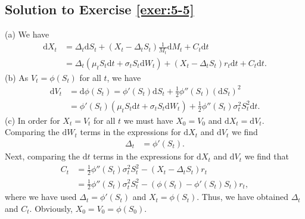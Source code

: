 \documentclass[12pt]{book}
\numberwithin{equation}{chapter}
\theoremstyle{plain}
\numberwithin{theorem}{section}
\theoremstyle{definition}
\numberwithin{exercise}{chapter}
\newcommand{\<}{\langle}
\renewcommand{\>}{\rangle}
\renewcommand{\(}{\left(}
\renewcommand{\)}{\right)}
\renewcommand{\[}{\left[}
\renewcommand{\]}{\right]}
\newcommand\sig{\sigma}
\newcommand\Del{\Delta}
\newcommand\dd{\mathrm{d}}
\theoremstyle{definition}
\numberwithin{question}{section}
\begin{document}
\subsection*{Solution to Exercise \ref{exer:5-5}}
(a) We have
\begin{align}
\dd X_t
	&=	\Del_t \dd S_t + (X_t - \Del_t S_t) \frac{1}{M_t} \dd M_t + C_t \dd t \\
	&=	\Del_t ( \mu_t S_t \dd t + \sig_t S_t \dd W_t ) + (X_t - \Del_t S_t) r_t \dd t + C_t \dd t . 
\end{align}
(b) As $V_t = \phi(S_t)$ for all $t$, we have
\begin{align}
\dd V_t
	&=	\dd \phi(S_t)
	=		\phi'(S_t) \dd S_t + \tfrac{1}{2} \phi''(S_t) (\dd S_t)^2 \\
	&=	\phi'(S_t) ( \mu_t S_t \dd t + \sig_t S_t \dd W_t ) + \tfrac{1}{2} \phi''(S_t) \sig_t^2 S_t^2 \dd t .
\end{align}
(c) In order for $X_t = V_t$ for all $t$ we must have $X_0 = V_0$ and $\dd X_t = \dd V_t$.  Comparing the $\dd W_t$ terms in the expressions for $\dd X_t$ and $\dd V_t$ we find
\begin{align}
\Del_t
	&=	\phi'(S_t) .
\end{align}
Next, comparing the $\dd t$ terms in the expressions for $\dd X_t$ and $\dd V_t$ we find that
\begin{align}
C_t
	&=	\tfrac{1}{2} \phi''(S_t) \sig_t^2 S_t^2 - (X_t - \Del_t S_t) r_t \\
	&=	\tfrac{1}{2} \phi''(S_t) \sig_t^2 S_t^2 - (\phi(S_t) - \phi'(S_t) S_t) r_t ,
\end{align}
where we have used $\Del_t = \phi'(S_t)$ and $X_t = \phi(S_t)$.  Thus, we have obtained $\Del_t$ and $C_t$.  Obviously, $X_0 = V_0 = \phi(S_0)$.

\end{document}

